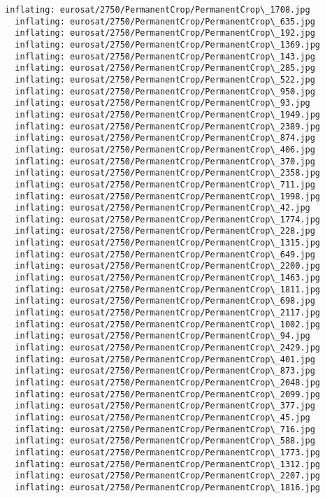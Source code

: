 \documentclass[11pt]{article}
\begin{document}
\begin{Verbatim}[commandchars=\\\{\}]
  inflating: eurosat/2750/PermanentCrop/PermanentCrop\_1708.jpg
  inflating: eurosat/2750/PermanentCrop/PermanentCrop\_635.jpg
  inflating: eurosat/2750/PermanentCrop/PermanentCrop\_192.jpg
  inflating: eurosat/2750/PermanentCrop/PermanentCrop\_1369.jpg
  inflating: eurosat/2750/PermanentCrop/PermanentCrop\_143.jpg
  inflating: eurosat/2750/PermanentCrop/PermanentCrop\_285.jpg
  inflating: eurosat/2750/PermanentCrop/PermanentCrop\_522.jpg
  inflating: eurosat/2750/PermanentCrop/PermanentCrop\_950.jpg
  inflating: eurosat/2750/PermanentCrop/PermanentCrop\_93.jpg
  inflating: eurosat/2750/PermanentCrop/PermanentCrop\_1949.jpg
  inflating: eurosat/2750/PermanentCrop/PermanentCrop\_2389.jpg
  inflating: eurosat/2750/PermanentCrop/PermanentCrop\_874.jpg
  inflating: eurosat/2750/PermanentCrop/PermanentCrop\_406.jpg
  inflating: eurosat/2750/PermanentCrop/PermanentCrop\_370.jpg
  inflating: eurosat/2750/PermanentCrop/PermanentCrop\_2358.jpg
  inflating: eurosat/2750/PermanentCrop/PermanentCrop\_711.jpg
  inflating: eurosat/2750/PermanentCrop/PermanentCrop\_1998.jpg
  inflating: eurosat/2750/PermanentCrop/PermanentCrop\_42.jpg
  inflating: eurosat/2750/PermanentCrop/PermanentCrop\_1774.jpg
  inflating: eurosat/2750/PermanentCrop/PermanentCrop\_228.jpg
  inflating: eurosat/2750/PermanentCrop/PermanentCrop\_1315.jpg
  inflating: eurosat/2750/PermanentCrop/PermanentCrop\_649.jpg
  inflating: eurosat/2750/PermanentCrop/PermanentCrop\_2200.jpg
  inflating: eurosat/2750/PermanentCrop/PermanentCrop\_1463.jpg
  inflating: eurosat/2750/PermanentCrop/PermanentCrop\_1811.jpg
  inflating: eurosat/2750/PermanentCrop/PermanentCrop\_698.jpg
  inflating: eurosat/2750/PermanentCrop/PermanentCrop\_2117.jpg
  inflating: eurosat/2750/PermanentCrop/PermanentCrop\_1002.jpg
  inflating: eurosat/2750/PermanentCrop/PermanentCrop\_94.jpg
  inflating: eurosat/2750/PermanentCrop/PermanentCrop\_2429.jpg
  inflating: eurosat/2750/PermanentCrop/PermanentCrop\_401.jpg
  inflating: eurosat/2750/PermanentCrop/PermanentCrop\_873.jpg
  inflating: eurosat/2750/PermanentCrop/PermanentCrop\_2048.jpg
  inflating: eurosat/2750/PermanentCrop/PermanentCrop\_2099.jpg
  inflating: eurosat/2750/PermanentCrop/PermanentCrop\_377.jpg
  inflating: eurosat/2750/PermanentCrop/PermanentCrop\_45.jpg
  inflating: eurosat/2750/PermanentCrop/PermanentCrop\_716.jpg
  inflating: eurosat/2750/PermanentCrop/PermanentCrop\_588.jpg
  inflating: eurosat/2750/PermanentCrop/PermanentCrop\_1773.jpg
  inflating: eurosat/2750/PermanentCrop/PermanentCrop\_1312.jpg
  inflating: eurosat/2750/PermanentCrop/PermanentCrop\_2207.jpg
  inflating: eurosat/2750/PermanentCrop/PermanentCrop\_1816.jpg

\end{Verbatim}
\end{document}
